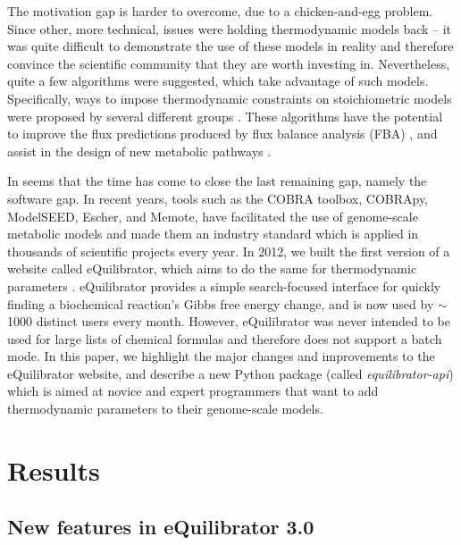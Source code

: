 \documentclass[twocolumn]{article}
\begin{document}
The motivation gap is harder to overcome, due to a chicken-and-egg problem. Since other, more technical, issues were holding thermodynamic models back -- it was quite difficult to demonstrate the use of these models in reality and therefore convince the scientific community that they are worth investing in. Nevertheless, quite a few algorithms were suggested, which take advantage of such models. Specifically, ways to impose thermodynamic constraints on stoichiometric models were proposed by several different groups \cite{holzhutter_principle_2004,henry_thermodynamics-based_2007,noor_pathway_2014}. These algorithms have the potential to improve the flux predictions produced by flux balance analysis (FBA) \cite{noor_removing_2018}, and assist in the design of new metabolic pathways \cite{hadicke_optmdfpathway:_2018}.

In seems that the time has come to close the last remaining gap, namely the software gap. In recent years, tools such as the COBRA toolbox, COBRApy, ModelSEED, Escher, and Memote, have facilitated the use of genome-scale metabolic models and made them an industry standard which is applied in thousands of scientific projects every year. In 2012, we built the first version of a website called eQuilibrator, which aims to do the same for thermodynamic parameters \cite{flamholz_equilibratorbiochemical_2012}. eQuilibrator provides a simple search-focused interface for quickly finding a biochemical reaction's Gibbs free energy change, and is now used by $\sim$1000 distinct users every month. However, eQuilibrator was never intended to be used for large lists of chemical formulas and therefore does not support a batch mode. In this paper, we highlight the major changes and improvements to the eQuilibrator website, and describe a new Python package (called \textit{equilibrator-api}) which is aimed at novice and expert programmers that want to add thermodynamic parameters to their genome-scale models.


\section{Results}

\subsection{New features in eQuilibrator 3.0}
\end{document}
